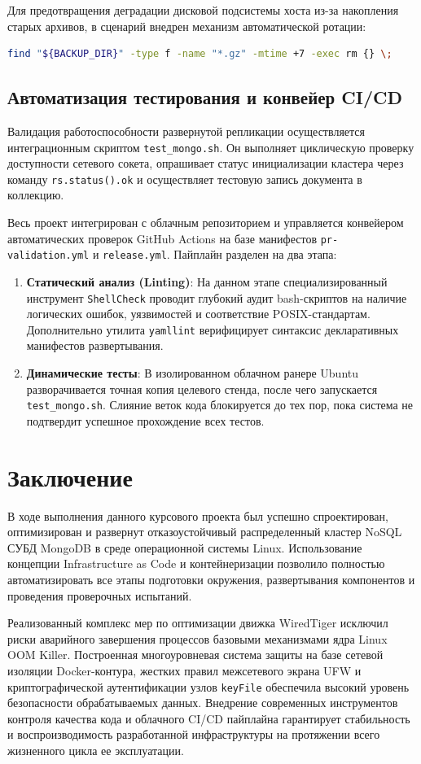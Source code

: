 \documentclass[a4paper,14pt]{extarticle}
\begin{document}
	Для предотвращения деградации дисковой подсистемы хоста из-за накопления старых архивов, в сценарий внедрен механизм автоматической ротации:
	\begin{lstlisting}[language=bash]
		find "${BACKUP_DIR}" -type f -name "*.gz" -mtime +7 -exec rm {} \;
	\end{lstlisting}
	
	\subsection{Автоматизация тестирования и конвейер CI/CD}
	Валидация работоспособности развернутой репликации осуществляется интеграционным скриптом \texttt{test\_mongo.sh}. Он выполняет циклическую проверку доступности сетевого сокета, опрашивает статус инициализации кластера через команду \texttt{rs.status().ok} и осуществляет тестовую запись документа в коллекцию.
	
	Весь проект интегрирован с облачным репозиторием и управляется конвейером автоматических проверок GitHub Actions на базе манифестов \texttt{pr-validation.yml} и \texttt{release.yml}. Пайплайн разделен на два этапа:
	\begin{enumerate}
		\item \textbf{Статический анализ (Linting)}: На данном этапе специализированный инструмент \texttt{ShellCheck} проводит глубокий аудит bash-скриптов на наличие логических ошибок, уязвимостей и соответствие POSIX-стандартам. Дополнительно утилита \texttt{yamllint} верифицирует синтаксис декларативных манифестов развертывания.
		\item \textbf{Динамические тесты}: В изолированном облачном ранере Ubuntu разворачивается точная копия целевого стенда, после чего запускается \texttt{test\_mongo.sh}. Слияние веток кода блокируется до тех пор, пока система не подтвердит успешное прохождение всех тестов.
	\end{enumerate}
	
	\newpage
	
	\section*{Заключение}
	В ходе выполнения данного курсового проекта был успешно спроектирован, оптимизирован и развернут отказоустойчивый распределенный кластер NoSQL СУБД MongoDB в среде операционной системы Linux. Использование концепции Infrastructure as Code и контейнеризации позволило полностью автоматизировать все этапы подготовки окружения, развертывания компонентов и проведения проверочных испытаний.
	
	Реализованный комплекс мер по оптимизации движка WiredTiger исключил риски аварийного завершения процессов базовыми механизмами ядра Linux OOM Killer. Построенная многоуровневая система защиты на базе сетевой изоляции Docker-контура, жестких правил межсетевого экрана UFW и криптографической аутентификации узлов \texttt{keyFile} обеспечила высокий уровень безопасности обрабатываемых данных. Внедрение современных инструментов контроля качества кода и облачного CI/CD пайплайна гарантирует стабильность и воспроизводимость разработанной инфраструктуры на протяжении всего жизненного цикла ее эксплуатации.
	
\end{document}
